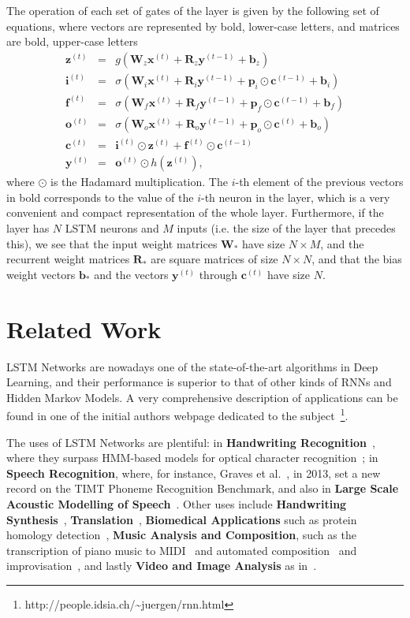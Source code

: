 \documentclass[conference]{IEEEtran}
\newcommand{\mb}[1]{\mathbf{#1}}
\begin{document}
The operation of each set of gates of the layer is given by the following set of equations, where vectors are
represented by bold, lower-case letters, and matrices are bold, upper-case letters
\begin{eqnarray}
    \mb{z}^{(t)} & = & g(\mb{W}_z \mb{x}^{(t)} + \mb{R}_z \mb{y}^{(t-1)} + \mb{b}_z) \nonumber\\
    \mb{i}^{(t)} & = & \sigma(\mb{W}_i \mb{x}^{(t)} + \mb{R}_i \mb{y}^{(t-1)} + \mb{p}_i \odot \mb{c}^{(t-1)} + \mb{b}_i) \nonumber\\
    \mb{f}^{(t)} & = & \sigma(\mb{W}_f \mb{x}^{(t)} + \mb{R}_f \mb{y}^{(t-1)} + \mb{p}_f \odot \mb{c}^{(t-1)} + \mb{b}_f) \nonumber\\
    \mb{o}^{(t)} & = & \sigma(\mb{W}_o \mb{x}^{(t)} + \mb{R}_o \mb{y}^{(t-1)} + \mb{p}_o \odot \mb{c}^{(t)} + \mb{b}_o) \nonumber\\
    \mb{c}^{(t)} & = & \mb{i}^{(t)} \odot \mb{z}^{(t)} + \mb{f}^{(t)} \odot \mb{c}^{(t-1)} \nonumber \\
    \mb{y}^{(t)} & = & \mb{o}^{(t)} \odot h(\mb{z}^{(t)}) \label{eq:equationsLSTM},
\end{eqnarray}
where $\odot$ is the Hadamard multiplication. The $i$-th element of the previous vectors in bold corresponds
to the value of the $i$-th neuron in the layer, which is a very convenient and compact representation of the
whole layer. Furthermore, if the layer has $N$ LSTM neurons and $M$ inputs (i.e. the size of the layer that
precedes this), we see that the input weight matrices $\mb{W}_*$ have size $N \times M$, and the  recurrent
weight matrices $\mb{R}_*$ are square matrices of size $N \times N$, and that the bias weight vectors $\mb{b}_*$
and the vectors $\mb{y}^{(t)}$ through $\mb{c}^{(t)}$ have size $N$.

\section{Related Work}\label{sec:relwork}
LSTM Networks are nowadays one of the state-of-the-art algorithms in Deep Learning, and their performance is
superior to that of other kinds of RNNs and Hidden Markov Models. A very comprehensive description of applications can be found in one of the initial
authors webpage dedicated to the subject~\footnote{http://people.idsia.ch/\~{}juergen/rnn.html}.

The uses of LSTM Networks are plentiful: in \textbf{Handwriting Recognition}~\cite{ICDAR09}, where they surpass
HMM-based models for optical character recognition~\cite{Breuel13}; in \textbf{Speech Recognition}, where, for
instance, Graves et al.~\cite{Graves13}, in 2013, set a new record on the TIMT Phoneme Recognition Benchmark,
and also in \textbf{Large Scale Acoustic Modelling of Speech}~\cite{Sak14}. Other uses include
\textbf{Handwriting Synthesis}~\cite{Graves13_2}, \textbf{Translation}~\cite{Sustkever14}, \textbf{Biomedical Applications} such
as protein homology detection~\cite{Hochreiter07}, \textbf{Music Analysis and Composition}, such as the transcription of piano music
to MIDI~\cite{Bock12} and automated composition~\cite{Coca13} and improvisation~\cite{Eck02}, and lastly \textbf{Video and Image Analysis} as
in~\cite{Vinyals14, Donahue14, Donahue14_2}.
\end{document}
